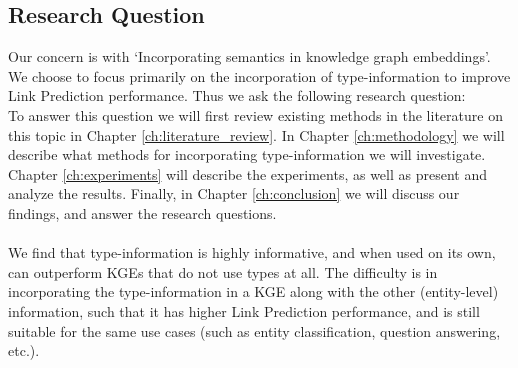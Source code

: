

\subsection*{Research Question}
Our concern is with `Incorporating semantics in knowledge graph embeddings'. We choose to focus primarily on the incorporation of type-information to improve Link Prediction performance.
Thus we ask the following research question: \\ 


To answer this question we will first review existing methods in the literature on this topic in Chapter \ref{ch:literature_review}. 
In Chapter \ref{ch:methodology} we will describe what methods for incorporating type-information we will investigate.
Chapter \ref{ch:experiments} will describe the experiments, as well as present and analyze the results. 
Finally, in Chapter \ref{ch:conclusion} we will discuss our findings, and answer the research questions.

\paragraph{}\noindent
We find that type-information is highly informative, and when used on its own, can outperform KGEs that do not use types at all. The difficulty is in incorporating the type-information in a KGE along with the other (entity-level) information, such that it has higher Link Prediction performance, and is still suitable for the same use cases (such as entity classification, question answering, etc.).



